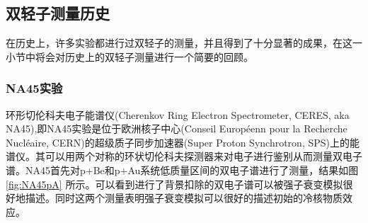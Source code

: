 \subsection{双轻子测量历史}

在历史上，许多实验都进行过双轻子的测量，并且得到了十分显著的成果，在这一小节中将会对历史上的双轻子测量进行一个简要的回顾。

\subsubsection{NA45实验}
环形切伦科夫电子能谱仪(Cherenkov Ring Electron Spectrometer, CERES, aka NA45),即NA45实验是位于欧洲核子中心(Conseil Européenn pour la Recherche Nucléaire, CERN)的超级质子同步加速器(Super Proton Synchrotron, SPS)上的能谱仪。其可以用两个对称的环状切伦科夫探测器来对电子进行鉴别从而测量双电子谱。NA45首先对p+Be和p+Au系统低质量区间的双电子谱进行了测量，结果如图 \ref{fig:NA45pA} 所示。可以看到进行了背景扣除的双电子谱可以被强子衰变模拟很好地描述。同时这两个测量表明强子衰变模拟可以很好的描述初始的冷核物质效应。

